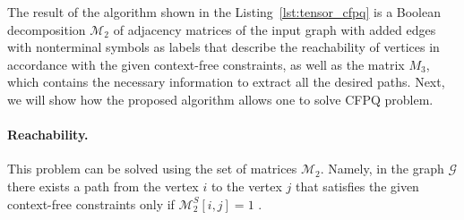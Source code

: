 The result of the algorithm shown in the Listing~\ref{lst:tensor_cfpq} is a Boolean decomposition $\mathcal{M}_2$ of adjacency matrices of the input graph with added edges with nonterminal symbols as labels that describe the reachability of vertices in accordance with the given context-free constraints, as well as the matrix $M_3$, which contains the necessary information to extract all the desired paths. Next, we will show how the proposed algorithm allows one to solve CFPQ problem.

\paragraph{Reachability.} %
This problem can be solved using the set of matrices $\mathcal{M}_2$. Namely, in the graph $\mathcal{G}$ there exists a path from the vertex $i$ to the vertex $j$ that satisfies the given context-free constraints only if $\mathcal{M}_2^S[i, j] = 1$ .

